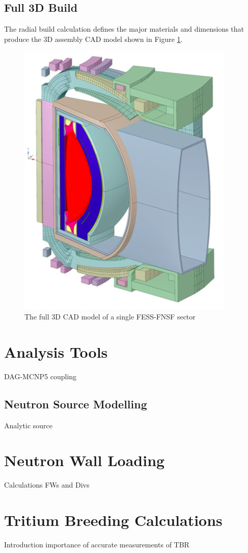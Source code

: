 \documentclass[12pt, letterpaper]{elsarticle}
\begin{document}
\subsection{Full 3D Build}
The radial build calculation defines the major materials and dimensions that produce the 3D assembly CAD model shown in Figure \ref{fig:cad_fess_fnsf_3d}.
\begin{figure}[cad_fess_fnsf_3d]
  \centering
  \includegraphics[scale=0.8]{../plots/fess_fnsf_3d_cad.png}
  \caption{The full 3D CAD model of a single FESS-FNSF sector}
  \label{fig:cad_fess_fnsf_3d}
\end{figure}
\section{Analysis Tools}
DAG-MCNP5 coupling
\subsection{Neutron Source Modelling}
Analytic source
\section{Neutron Wall Loading}
Calculations FWs and Divs
\section{Tritium Breeding Calculations}
Introduction
importance of accurate measurements of TBR
\end{document}
